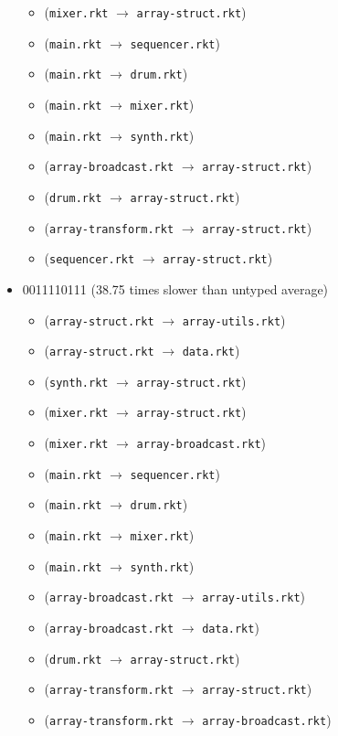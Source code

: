 \documentclass{article}
\newcommand{\mono}[1]{\texttt{#1}}
\begin{document}
\begin{itemize}
\begin{itemize}
  \item (\mono{mixer.rkt} $\rightarrow$ \mono{array-struct.rkt})
  \item (\mono{main.rkt} $\rightarrow$ \mono{sequencer.rkt})
  \item (\mono{main.rkt} $\rightarrow$ \mono{drum.rkt})
  \item (\mono{main.rkt} $\rightarrow$ \mono{mixer.rkt})
  \item (\mono{main.rkt} $\rightarrow$ \mono{synth.rkt})
  \item (\mono{array-broadcast.rkt} $\rightarrow$ \mono{array-struct.rkt})
  \item (\mono{drum.rkt} $\rightarrow$ \mono{array-struct.rkt})
  \item (\mono{array-transform.rkt} $\rightarrow$ \mono{array-struct.rkt})
  \item (\mono{sequencer.rkt} $\rightarrow$ \mono{array-struct.rkt})
  \end{itemize}
\item 0011110111 (38.75 times slower than untyped average)
  \begin{itemize}
  \item (\mono{array-struct.rkt} $\rightarrow$ \mono{array-utils.rkt})
  \item (\mono{array-struct.rkt} $\rightarrow$ \mono{data.rkt})
  \item (\mono{synth.rkt} $\rightarrow$ \mono{array-struct.rkt})
  \item (\mono{mixer.rkt} $\rightarrow$ \mono{array-struct.rkt})
  \item (\mono{mixer.rkt} $\rightarrow$ \mono{array-broadcast.rkt})
  \item (\mono{main.rkt} $\rightarrow$ \mono{sequencer.rkt})
  \item (\mono{main.rkt} $\rightarrow$ \mono{drum.rkt})
  \item (\mono{main.rkt} $\rightarrow$ \mono{mixer.rkt})
  \item (\mono{main.rkt} $\rightarrow$ \mono{synth.rkt})
  \item (\mono{array-broadcast.rkt} $\rightarrow$ \mono{array-utils.rkt})
  \item (\mono{array-broadcast.rkt} $\rightarrow$ \mono{data.rkt})
  \item (\mono{drum.rkt} $\rightarrow$ \mono{array-struct.rkt})
  \item (\mono{array-transform.rkt} $\rightarrow$ \mono{array-struct.rkt})
  \item (\mono{array-transform.rkt} $\rightarrow$ \mono{array-broadcast.rkt})

\end{itemize}
\end{itemize}
\end{document}
